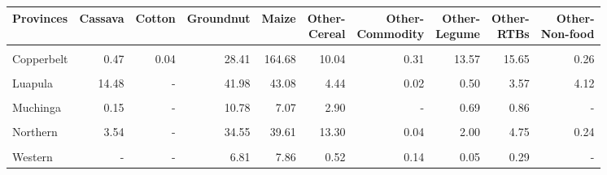 \begin{table}[!h]
\centering\begingroup\fontsize{7}{9}\selectfont

\begin{tabular}{>{\raggedright\arraybackslash}p{1.8cm}rrrrrrrrr}
\toprule
Provinces & Cassava & Cotton & Groundnut & Maize & \makecell{Other-\\Cereal} & \makecell{Other-\\Commodity} & \makecell{Other-\\Legume} & \makecell{Other-\\RTBs} & \makecell{Other-\\Non-food}\\
\midrule
\cellcolor{gray!10}{Central} & \cellcolor{gray!10}{0.06} & \cellcolor{gray!10}{0.04} & \cellcolor{gray!10}{23.09} & \cellcolor{gray!10}{49.72} & \cellcolor{gray!10}{8.76} & \cellcolor{gray!10}{0.95} & \cellcolor{gray!10}{4.27} & \cellcolor{gray!10}{5.96} & \cellcolor{gray!10}{-}\\
Copperbelt & 0.47 & 0.04 & 28.41 & 164.68 & 10.04 & 0.31 & 13.57 & 15.65 & 0.26\\
\cellcolor{gray!10}{Eastern} & \cellcolor{gray!10}{-} & \cellcolor{gray!10}{-} & \cellcolor{gray!10}{3.11} & \cellcolor{gray!10}{-} & \cellcolor{gray!10}{-} & \cellcolor{gray!10}{-} & \cellcolor{gray!10}{0.13} & \cellcolor{gray!10}{-} & \cellcolor{gray!10}{-}\\
Luapula & 14.48 & - & 41.98 & 43.08 & 4.44 & 0.02 & 0.50 & 3.57 & 4.12\\
\cellcolor{gray!10}{Lusaka} & \cellcolor{gray!10}{-} & \cellcolor{gray!10}{-} & \cellcolor{gray!10}{0.18} & \cellcolor{gray!10}{-} & \cellcolor{gray!10}{-} & \cellcolor{gray!10}{-} & \cellcolor{gray!10}{-} & \cellcolor{gray!10}{-} & \cellcolor{gray!10}{-}\\
\addlinespace
Muchinga & 0.15 & - & 10.78 & 7.07 & 2.90 & - & 0.69 & 0.86 & -\\
\cellcolor{gray!10}{North-Western} & \cellcolor{gray!10}{47.79} & \cellcolor{gray!10}{-} & \cellcolor{gray!10}{20.48} & \cellcolor{gray!10}{173.35} & \cellcolor{gray!10}{10.61} & \cellcolor{gray!10}{0.06} & \cellcolor{gray!10}{1.86} & \cellcolor{gray!10}{8.63} & \cellcolor{gray!10}{2.81}\\
Northern & 3.54 & - & 34.55 & 39.61 & 13.30 & 0.04 & 2.00 & 4.75 & 0.24\\
\cellcolor{gray!10}{Southern} & \cellcolor{gray!10}{-} & \cellcolor{gray!10}{-} & \cellcolor{gray!10}{0.53} & \cellcolor{gray!10}{-} & \cellcolor{gray!10}{-} & \cellcolor{gray!10}{-} & \cellcolor{gray!10}{-} & \cellcolor{gray!10}{-} & \cellcolor{gray!10}{-}\\
Western & - & - & 6.81 & 7.86 & 0.52 & 0.14 & 0.05 & 0.29 & -\\
\bottomrule
\end{tabular}
\endgroup{}
\end{table}
